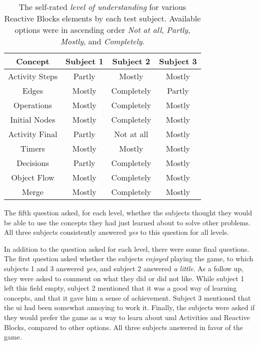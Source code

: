 \begin{table}[htp]
	\centering
	\begin{tabulary}{\textwidth}{| C | C | C | C |}
		\hline
		\textbf{Concept} & \textbf{Subject 1} & \textbf{Subject 2} & \textbf{Subject 3} \\
		\hline
		Activity Steps & Partly & Mostly & Mostly\\
		\hline
		Edges & Mostly & Completely & Partly \\
		\hline
		Operations & Mostly & Completely & Mostly \\
		\hline
		Initial Nodes & Mostly & Completely & Mostly \\
		\hline
		Activity Final & Partly & Not at all & Mostly \\
		\hline
		Timers & Mostly & Mostly & Mostly \\
		\hline
		Decisions & Partly & Completely & Mostly \\
		\hline
		Object Flow & Mostly & Completely & Mostly \\
		\hline
		Merge & Mostly & Completely & Mostly \\
		\hline
	\end{tabulary}
	\caption[Test Subject 1 Levels of Understanding]{The self-rated \emph{level of understanding} for various Reactive Blocks elements by each test subject. Available options were in ascending order \emph{Not at all}, \emph{Partly}, \emph{Mostly}, and \emph{Completely}.}
	\label{tab:subject_understanding}
\end{table}

\noindent
The fifth question asked, for each level, whether the subjects thought they would be able to use the concepts they had just learned about to solve other problems. All three subjects consistently answered \emph{yes} to this question for all levels.

\noindent
In addition to the question asked for each level, there were some final questions. The first question asked whether the subjects \emph{enjoyed} playing the game, to which subjects 1 and 3 answered \emph{yes}, and subject 2 answered \emph{a little}. As a follow up, they were asked to comment on what they did or did not like. While subject 1 left this field empty, subject 2 mentioned that it was a good way of learning concepts, and that it gave him a sense of achievement. Subject 3 mentioned that the \gls{ui} had been somewhat annoying to work it. Finally, the subjects were asked if they would prefer the game as a way to learn about \gls{uml} Activities and Reactive Blocks, compared to other options. All three subjects answered in favor of the game.

